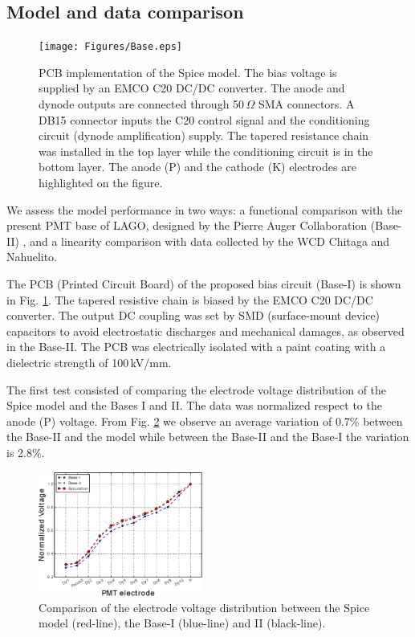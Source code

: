 \documentclass[letterpaper, 10 pt, conference]{ieeeconf}  %
\begin{document}
\subsection{Model and data comparison}

\begin{figure}[h!]
\begin{center}
\texttt{[image: Figures/Base.eps]}
\caption{PCB implementation of the Spice model. The bias voltage is supplied by an EMCO C20 DC/DC converter. The anode and dynode outputs are connected through 50\,$\Omega$ SMA connectors. A DB15 connector inputs the C20 control signal and the conditioning circuit (dynode amplification) supply. The tapered resistance chain was installed in the top layer while the conditioning circuit is in the bottom layer. The anode (P) and the cathode (K) electrodes are highlighted on the figure.}
\label{Base}
\end{center}
\end{figure}

We assess the model performance in two ways: a functional comparison with the present PMT base of LAGO, designed by the Pierre Auger Collaboration (Base-II) \cite{Genolini2001}, and a linearity comparison with data collected by the WCD Chitaga and Nahuelito. 

The PCB (Printed Circuit Board) of the proposed bias circuit (Base-I) is shown in Fig. \ref{Base}. The tapered resistive chain is biased by the EMCO C20 DC/DC converter. The output DC coupling was set by SMD (surface-mount device) capacitors to avoid electrostatic discharges and mechanical damages, as observed in the Base-II. The PCB was electrically isolated with a paint coating with a dielectric strength of 100\,kV/mm.

The first test consisted of comparing the electrode voltage distribution of the Spice model and the Bases I and II. The data was normalized respect to the anode (P) voltage. From Fig. \ref{Comparison} we observe an average variation of 0.7$\%$ between the Base-II and the model while between the Base-II and the Base-I the variation is 2.8$\%$.

\begin{figure}[h!]
\begin{center}
\includegraphics[width=0.48\textwidth]{Figures/LAGO_Auger.eps}
\caption{Comparison of the electrode voltage distribution between the Spice model (red-line), the Base-I (blue-line) and II (black-line).}
\label{Comparison}
\end{center}
\end{figure}
\end{document}
